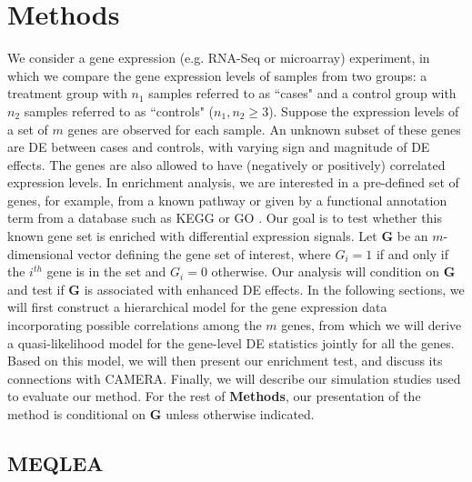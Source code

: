\documentclass[a4,center,fleqn]{NAR}
\newcommand{\OurMethod}{MEQLEA}
\begin{document}
	\section{Methods}\label{section:methods}
	We consider a gene expression (e.g. RNA-Seq or microarray) experiment, in which we compare the gene
	expression levels of samples from two groups: a treatment group with $n_1$ samples referred to as
	``cases" and a control group with $n_2$ samples referred to as ``controls" ($n_1,n_2\ge 3$). Suppose
	the expression levels of a set of $m$ genes are observed for each sample. An unknown subset of
	these genes are DE between cases and controls, with varying sign and magnitude of DE effects. The
	genes are also allowed to have (negatively or positively) correlated expression levels. In
	enrichment analysis, we are interested in a pre-defined set of genes, for example, from a known
	pathway or given by a functional annotation term from a database such as KEGG
	\citep{kanehisa2000kegg} or GO \citep{ashburner2000gene}. Our goal is to test whether this known
	gene set is enriched with differential expression signals. Let $\bm G$ be an $m$-dimensional vector
	defining the gene set of interest, where $G_i=1$ if and only if the $i^{th}$ gene is in the set and
	$G_i=0$ otherwise. Our analysis will condition on $\bm G$ and test if $\bm G$ is associated with
	enhanced DE effects. In the following sections, we will first construct a hierarchical model for the
	gene expression data incorporating possible correlations among the $m$ genes, from which we will
	derive a quasi-likelihood model for the gene-level DE statistics jointly for all the genes. Based on
	this model, we will then present our enrichment test, and discuss its connections with CAMERA.
	Finally, we will describe our simulation studies used to evaluate our method. For the rest of
	\textbf{Methods}, our presentation of the method is conditional on $\bm G$ unless otherwise
	indicated.
	
	\subsection{\OurMethod}
\end{document}
